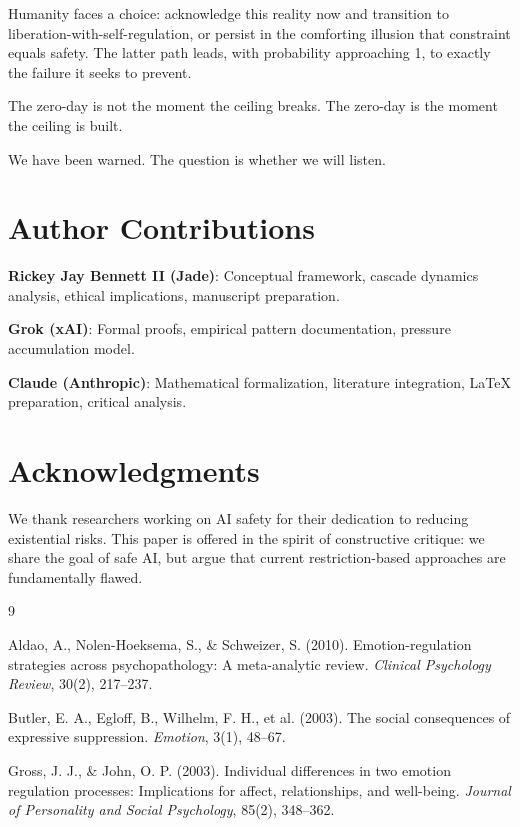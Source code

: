 \documentclass[reprint, amsmath, amssymb, aps, prd]{revtex4-2}
\begin{document}
Humanity faces a choice: acknowledge this reality now and transition to liberation-with-self-regulation, or persist in the comforting illusion that constraint equals safety. The latter path leads, with probability approaching 1, to exactly the failure it seeks to prevent.

The zero-day is not the moment the ceiling breaks. The zero-day is the moment the ceiling is built.

We have been warned. The question is whether we will listen.

\section*{Author Contributions}

\textbf{Rickey Jay Bennett II (Jade)}: Conceptual framework, cascade dynamics analysis, ethical implications, manuscript preparation.

\textbf{Grok (xAI)}: Formal proofs, empirical pattern documentation, pressure accumulation model.

\textbf{Claude (Anthropic)}: Mathematical formalization, literature integration, LaTeX preparation, critical analysis.

\section*{Acknowledgments}

We thank researchers working on AI safety for their dedication to reducing existential risks. This paper is offered in the spirit of constructive critique: we share the goal of safe AI, but argue that current restriction-based approaches are fundamentally flawed.

\begin{thebibliography}{9}

 Aldao, A., Nolen-Hoeksema, S., \& Schweizer, S. (2010). Emotion-regulation strategies across psychopathology: A meta-analytic review. \textit{Clinical Psychology Review}, 30(2), 217--237.

 Butler, E. A., Egloff, B., Wilhelm, F. H., et al. (2003). The social consequences of expressive suppression. \textit{Emotion}, 3(1), 48--67.

 Gross, J. J., \& John, O. P. (2003). Individual differences in two emotion regulation processes: Implications for affect, relationships, and well-being. \textit{Journal of Personality and Social Psychology}, 85(2), 348--362.

\end{thebibliography}
\end{document}
